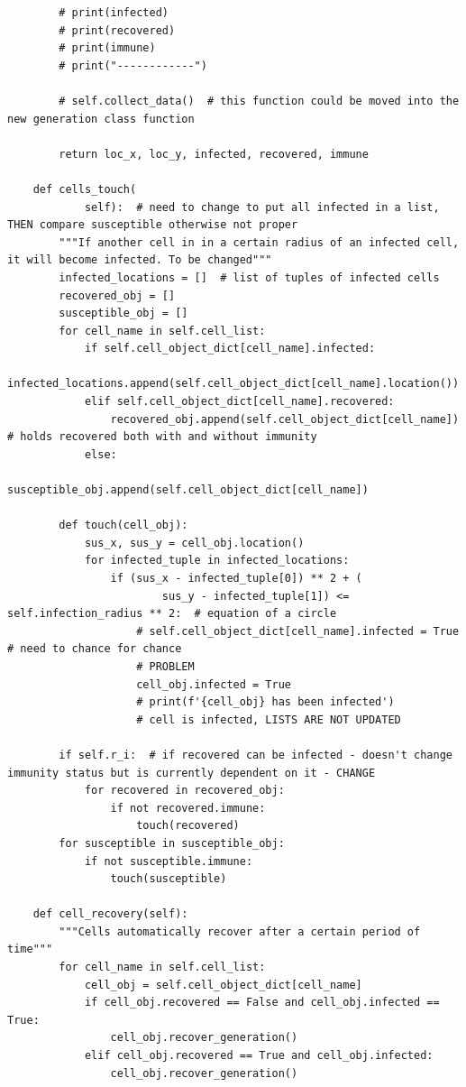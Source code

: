 \documentclass[11pt, a4paper]{article}
\begin{document}
\begin{lstlisting}
        # print(infected)
        # print(recovered)
        # print(immune)
        # print("------------")

        # self.collect_data()  # this function could be moved into the new generation class function

        return loc_x, loc_y, infected, recovered, immune

    def cells_touch(
            self):  # need to change to put all infected in a list, THEN compare susceptible otherwise not proper
        """If another cell in in a certain radius of an infected cell, it will become infected. To be changed"""
        infected_locations = []  # list of tuples of infected cells
        recovered_obj = []
        susceptible_obj = []
        for cell_name in self.cell_list:
            if self.cell_object_dict[cell_name].infected:
                infected_locations.append(self.cell_object_dict[cell_name].location())
            elif self.cell_object_dict[cell_name].recovered:
                recovered_obj.append(self.cell_object_dict[cell_name])  # holds recovered both with and without immunity
            else:
                susceptible_obj.append(self.cell_object_dict[cell_name])

        def touch(cell_obj):
            sus_x, sus_y = cell_obj.location()
            for infected_tuple in infected_locations:
                if (sus_x - infected_tuple[0]) ** 2 + (
                        sus_y - infected_tuple[1]) <= self.infection_radius ** 2:  # equation of a circle
                    # self.cell_object_dict[cell_name].infected = True  # need to chance for chance
                    # PROBLEM
                    cell_obj.infected = True
                    # print(f'{cell_obj} has been infected')
                    # cell is infected, LISTS ARE NOT UPDATED

        if self.r_i:  # if recovered can be infected - doesn't change immunity status but is currently dependent on it - CHANGE
            for recovered in recovered_obj:
                if not recovered.immune:
                    touch(recovered)
        for susceptible in susceptible_obj:
            if not susceptible.immune:
                touch(susceptible)

    def cell_recovery(self):
        """Cells automatically recover after a certain period of time"""
        for cell_name in self.cell_list:
            cell_obj = self.cell_object_dict[cell_name]
            if cell_obj.recovered == False and cell_obj.infected == True:
                cell_obj.recover_generation()
            elif cell_obj.recovered == True and cell_obj.infected:
                cell_obj.recover_generation()


\end{lstlisting}
\end{document}

